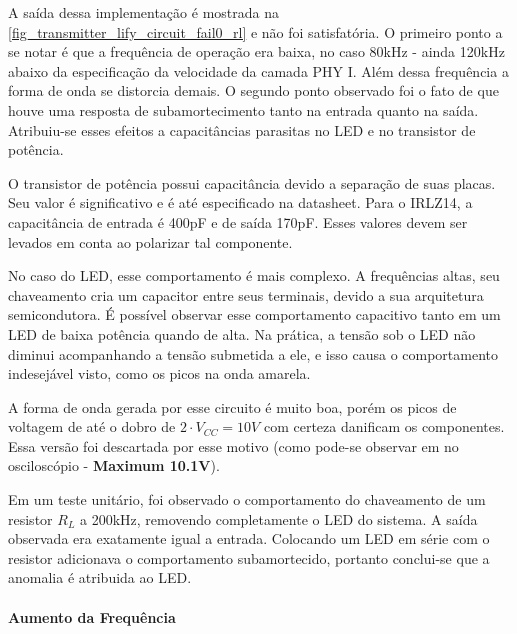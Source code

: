 	A saída dessa implementação é mostrada na \autoref{fig_transmitter_lify_circuit_fail0_rl} e não foi satisfatória. O primeiro ponto a se notar é que a frequência de operação era baixa, no caso 80kHz - ainda 120kHz abaixo da especificação da velocidade da camada PHY I. Além dessa frequência a forma de onda se distorcia demais. O segundo ponto observado foi o fato de que houve uma resposta de subamortecimento tanto na entrada quanto na saída. Atribuiu-se esses efeitos a capacitâncias parasitas no LED e no transistor de potência.
	
	O transistor de potência possui capacitância devido a separação de suas placas. Seu valor é significativo e é até especificado na datasheet. Para o IRLZ14, a capacitância de entrada é 400pF e de saída 170pF. Esses valores devem ser levados em conta ao polarizar tal componente. 

	No caso do LED, esse comportamento é mais complexo. A frequências altas, seu chaveamento cria um capacitor entre seus terminais, devido a sua arquitetura semicondutora. É possível observar esse comportamento capacitivo tanto em um LED de baixa potência quando de alta. Na prática, a tensão sob o LED não diminui acompanhando a tensão submetida a ele, e isso causa o comportamento indesejável visto, como os picos na onda amarela.
	
	A forma de onda gerada por esse circuito é muito boa, porém os picos de voltagem de até o dobro de $2 \cdot V_{CC} = 10V$ com certeza danificam os componentes. Essa versão foi descartada por esse motivo (como pode-se observar em no osciloscópio - \textbf{Maximum 10.1V}). 
	
	Em um teste unitário, foi observado o comportamento do chaveamento de um resistor $R_{L}$ a 200kHz, removendo completamente o LED do sistema. A saída observada era exatamente igual a entrada. Colocando um LED em série com o resistor adicionava o comportamento subamortecido, portanto conclui-se que a anomalia é atribuida ao LED.
	
	\paragraph{Aumento da Frequência}

